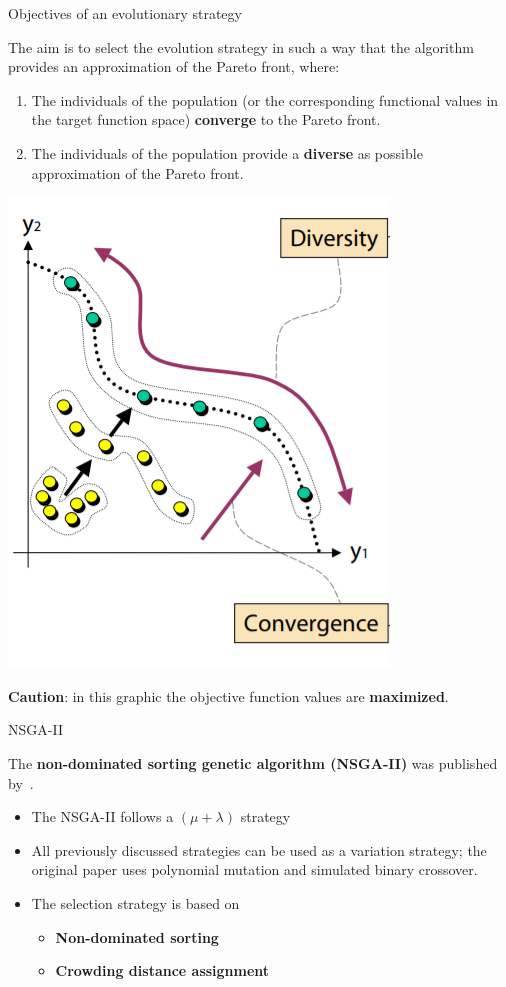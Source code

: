 \begin{frame}{Objectives of an evolutionary strategy}

The aim is to select the evolution strategy in such a way that the algorithm provides an approximation of the Pareto front, where:

\begin{enumerate}
\item The individuals of the population (or the corresponding functional values in the target function space) \textbf{converge} to the Pareto front.
\item The individuals of the population provide a \textbf{diverse} as possible approximation of the Pareto front.
\end{enumerate}

\vspace*{-0.3cm}

\begin{center}
\includegraphics[width = 0.2\linewidth]{images/EMO_goals.png}
\end{center}

\vspace*{-0.5cm}

\begin{footnotesize}
\textbf{Caution}: in this graphic the objective function values are \textbf{maximized}. %
\end{footnotesize}

\end{frame}

\begin{frame}{NSGA-II}

The \textbf{non-dominated sorting genetic algorithm (NSGA-II)} was published by~.

\begin{itemize}
\item The NSGA-II follows a $(\mu + \lambda)$ strategy
\item All previously discussed strategies can be used as a variation strategy; the original paper uses polynomial mutation and simulated binary crossover.
\item The selection strategy is based on
\begin{itemize}
\item \textbf{Non-dominated sorting}
\item \textbf{Crowding distance assignment}
\end{itemize}
\end{itemize}

\end{frame}

